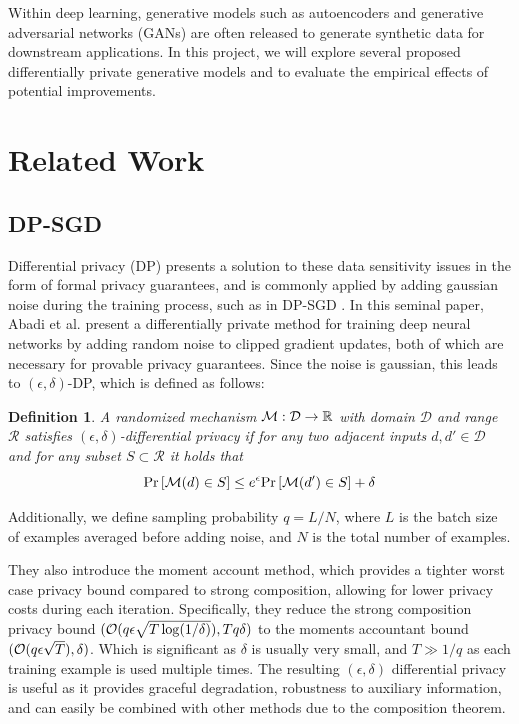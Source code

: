 \documentclass{article}
\newtheorem{definition}{Definition}
\begin{document}
Within deep learning, generative models such as autoencoders and generative adversarial networks (GANs) are often released to generate synthetic data for downstream applications. In this project, we will explore several proposed differentially private generative models and to evaluate the empirical effects of potential improvements.



\section{Related Work}
\newcommand{\M}{\mathcal{M}}
\newcommand{\D}{\mathcal{D}}
\newcommand{\RR}{\mathcal{R}}

\subsection{DP-SGD}
Differential privacy (DP) presents a solution to these data sensitivity issues in the form of formal privacy guarantees, and is commonly applied by adding gaussian noise during the training process, such as in DP-SGD \cite{dpsgd}. In this seminal paper, Abadi et al. present a differentially private method for training deep neural networks by adding random noise to clipped gradient updates, both of which are necessary for provable privacy guarantees. Since the noise is gaussian, this leads to $(\epsilon, \delta)$-DP, which is defined as follows:
\begin{definition}
	A randomized mechanism $\M : \D \rightarrow \R$ with domain $\D$ and range $\RR$ satisfies $(\epsilon, \delta)$-differential privacy if for any two adjacent inputs $d, d' \in \D$ and for any subset $S \subset \RR$ it holds that
\[
	\pr{\M(d) \in S} \leq e^\epsilon \pr{\M(d') \in S} + \delta
\]
\end{definition}
Additionally, we define sampling probability $q = L/N$, where $L$ is the batch size of examples averaged before adding noise, and $N$ is the total number of examples.

They also introduce the moment account method, which provides a tighter worst case privacy bound compared to strong composition, allowing for lower privacy costs during each iteration. Specifically, they reduce the strong composition privacy bound $(\mathcal O(q\epsilon\sqrt{T\log(1/\delta)}), Tq\delta)$ to the moments accountant bound $(\mathcal O(q\epsilon\sqrt{T}), \delta)$. Which is significant as $\delta$ is usually very small, and $T \gg 1/q$ as each training example is used multiple times. The resulting $(\epsilon, \delta)$ differential privacy is useful as it provides graceful degradation, robustness to auxiliary information, and can easily be combined with other methods due to the composition theorem.
\end{document}
